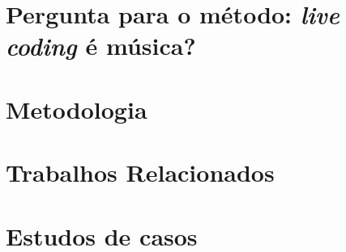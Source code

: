 \documentclass[
	12pt,				%
	openright,			%
	twoside,			%
	a4paper,			%
	english,			%
	french,				%
	spanish,			%
        italian,                        %
	brazil				%
	]{abntex2}
\begin{document}

%
\tableofcontents*
\cleardoublepage
\textual




\chapter{Pergunta para o método: \emph{live coding} é música?}\label{cap:introducao}

%

\chapter{Metodologia}\label{cap:metodologia}


\chapter{Trabalhos Relacionados}\label{cap:trabalhos_relacionados}


\chapter{Estudos de casos}\label{cap:estudos_de_caso}
\end{document}
